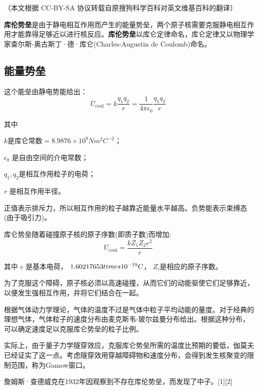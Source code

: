 
（本文根据 CC-BY-SA 协议转载自原搜狗科学百科对英文维基百科的翻译）

\textbf{库伦势垒}是由于静电相互作用而产生的能量势垒，两个原子核需要克服静电相互作用才能靠得足够近以进行核反应。\textbf{库伦势垒}以库仑定律命名，库仑定律又以物理学家查尔斯-奥古斯丁·德·库仑(Charles-Augustin de Coulomb)命名。

\subsection{能量势垒}
这个能垒由静电势能给出：
$$U_{\text{coul}} = k \frac{q_1 q_2}{r} = \frac{1}{4\pi\epsilon_0} \frac{q_1 q_2}{r}~$$

其中

$k\text{是库仑常数}= 8.9876\times10^9 N m^2 C^{-2}$；

$\epsilon_0$ 是自由空间的介电常数；

$q_1, q_2$是相互作用粒子的电荷；

$r$ 是相互作用半径。

正值表示排斥力，所以相互作用的粒子越靠近能量水平越高。负势能表示束缚态(由于吸引力)。

库仑势垒随着碰撞原子核的原子序数(即质子数)而增加:
\begin{equation}
U_{\text{coul}} = \frac{k Z_1 Z_2 e^2}{r}~
\end{equation}

其中 $e$ 是基本电荷， $1.602 \\ 176 \\ 53 \\times 10^{-19}C$， $Z_i $是相应的原子序数。

为了克服这个障碍，原子核必须以高速碰撞，从而它们的动能驱使它们足够靠近，以便发生强相互作用，并将它们结合在一起。

根据气体动力学理论，气体的温度不过是气体中粒子平均动能的量度。对于经典的理想气体，气体粒子的速度分布由麦克斯韦-玻尔兹曼分布给出。根据这种分布，可以确定速度足以克服库仑势垒的粒子比例。

实际上，由于量子力学隧穿效应，克服库仑势垒所需的温度比预期的要低，伽莫夫已经证实了这一点。考虑隧穿效用穿越障碍物和速度分布，会得到发生核聚变的限制范围，称为Gamow窗口。

詹姆斯·查德威克在1932年因观察到不存在库伦势垒，而发现了中子。[1][2]

